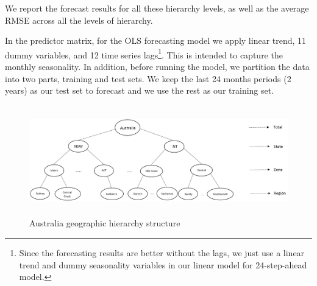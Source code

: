 \documentclass[11pt,a4paper,]{article}
\begin{document}
We report the forecast results for all these hierarchy levels, as well as the average RMSE across all the levels of hierarchy.

In the predictor matrix, for the OLS forecasting model we apply linear trend, 11 dummy variables, and 12 time series lags\footnote{Since the forecasting results are better without the lags, we just use a linear trend and dummy seasonality variables in our linear model for 24-step-ahead model.}. This is intended to capture the monthly seasonality. In addition, before running the model, we partition the data into two parts, training and test sets. We keep the last 24 months periods (2 years) as our test set to forecast and we use the rest as our training set.

\begin{figure}

{\centering \includegraphics[width=450px,height=180px]{Paper-Figures/Australian_hierarchy_structure} 

}

\caption{Australia geographic hierarchy structure}\label{fig:Australiahierarchystructure}
\end{figure}
\end{document}
